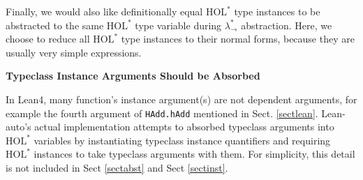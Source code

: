   Finally, we would also like definitionally equal $\text{HOL}^*$ type instances to
be abstracted to the same $\text{HOL}^*$ type variable during $\lambda_\to^*$ abstraction.
Here, we choose to reduce all $\text{HOL}^*$ type instances to their normal forms, because they
are usually very simple expressions.

\noindent \textbf{Typeclass Instance Arguments Should be Absorbed}

  In Lean4, many function's instance argument(s) are not dependent arguments,
for example the fourth argument of \texttt{HAdd.hAdd} mentioned in Sect. \ref{sectlean}.
Lean-auto's actual implementation attempts to absorbed typeclass arguments into
$\text{HOL}^*$ variables by instantiating typeclass instance quantifiers
and requiring $\text{HOL}^*$ instances to take typeclass arguments with them. For
simplicity, this detail is not included in Sect \ref{sectabst} and Sect \ref{sectinst}.
